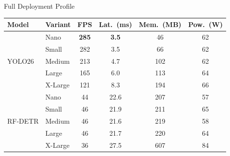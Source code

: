 \begin{frame}{Full Deployment Profile}
	\centering
	\scriptsize
	\setlength{\tabcolsep}{4pt}
	\begin{tabular}{llcccc}
		\toprule
		\textbf{Model} & \textbf{Variant} & \textbf{FPS} & \textbf{Lat.\ (ms)} & \textbf{Mem.\ (MB)} & \textbf{Pow.\ (W)} \\
		\midrule
		\multirow{5}{*}{YOLO26}
		               & Nano             & \textbf{285} & \textbf{3.5}        & 46                  & 62                 \\
		               & Small            & 282          & 3.5                 & 66                  & 62                 \\
		               & Medium           & 213          & 4.7                 & 102                 & 62                 \\
		               & Large            & 165          & 6.0                 & 113                 & 64                 \\
		               & X-Large          & 121          & 8.3                 & 194                 & 66                 \\
		\midrule
		\multirow{5}{*}{RF-DETR}
		               & Nano             & 44           & 22.6                & 207                 & 57                 \\
		               & Small            & 46           & 21.9                & 211                 & 65                 \\
		               & Medium           & 46           & 21.6                & 219                 & 58                 \\
		               & Large            & 46           & 21.7                & 220                 & 64                 \\
		               & X-Large          & 36           & 27.5                & 607                 & 84                 \\
		\bottomrule
	\end{tabular}
\end{frame}

